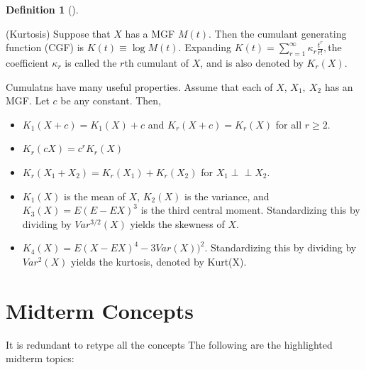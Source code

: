 \documentclass[
  letterpaper,
  DIV=11,
  numbers=noendperiod]{scrreprt}
\theoremstyle{plain}
\theoremstyle{definition}
\newtheorem{definition}{Definition}[chapter]
\theoremstyle{remark}
\begin{document}
\leavevmode{}%
\begin{definition}[]\label{def-kurtosis}

(Kurtosis) Suppose that \(\displaystyle X\) has a MGF
\(\displaystyle M( t)\). Then the cumulant generating function (CGF) is
\(\displaystyle K( t) \equiv \log M( t)\). Expanding
\(\displaystyle K( t) =\sum _{r=1}^{\infty } \kappa _{r}\frac{t^{r}}{r!} ,\)the
coefficient \(\displaystyle \kappa _{r}\) is called the
\(\displaystyle r\)th cumulant of \(\displaystyle X\), and is also
denoted by \(\displaystyle K_{r}( X)\).

Cumulatns have many useful properties. Assume that each of
\(\displaystyle X\), \(\displaystyle X_{1} ,\ X_{2}\) has an MGF. Let
\(\displaystyle c\) be any constant. Then,

\begin{itemize}
\item
  \(\displaystyle K_{1}( X+c) =K_{1}( X) +c\) and
  \(\displaystyle K_{r}( X+c) =K_{r}( X)\) for all
  \(\displaystyle r\geqslant 2\).
\item
  \(\displaystyle K_{r}( cX) =c^{r} K_{r}( X)\)
\item
  \(\displaystyle K_{r}( X_{1} +X_{2}) =K_{r}( X_{1}) +K_{r}( X_{2})\)
  for \(\displaystyle X_{1} \perp\!\!\!\!\perp X_{2}\).
\item
  \(\displaystyle K_{1}( X)\) is the mean of \(\displaystyle X\),
  \(\displaystyle K_{2}( X)\) is the variance, and
  \(\displaystyle K_{3}( X) =E( E-EX)^{3}\) is the third central moment.
  Standardizing this by dividing by \(\displaystyle Var^{3/2}( X)\)
  yields the skewness of \(\displaystyle X\).
\item
  \(\displaystyle K_{4}( X) =E( X-EX)^{4} -3Var( X))^{2}\).
  Standardizing this by dividing by \(\displaystyle Var^{2}( X)\) yields
  the kurtosis, denoted by Kurt(X).
\end{itemize}

\end{definition}

\hypertarget{midterm-concepts}{%
\section*{Midterm Concepts}\label{midterm-concepts}}


It is redundant to retype all the concepts The following are the
highlighted midterm topics:
\end{document}
